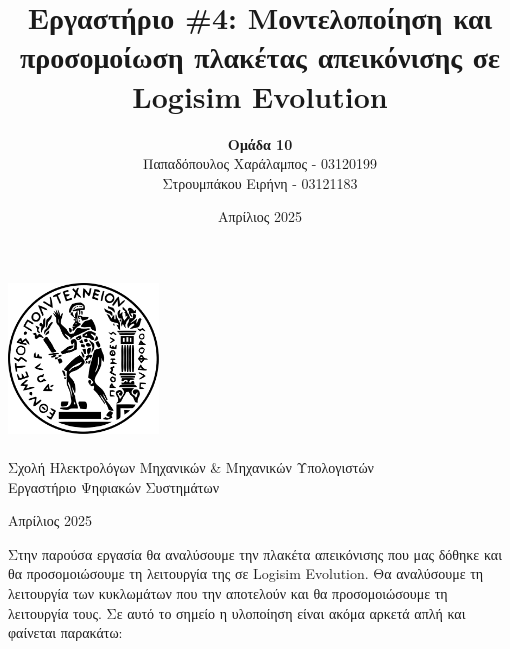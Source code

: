 \documentclass[12pt]{article}
\title{\Large Εργαστήριο \#4: Μοντελοποίηση και προσομοίωση πλακέτας απεικόνισης σε Logisim Evolution}
\author{\textbf{Ομάδα 10} \\
        Παπαδόπουλος Χαράλαμπος - 03120199\\
        Στρουμπάκου Ειρήνη  - 03121183 \\
}
\date{Απρίλιος 2025}
\begin{document}
    \begin{titlepage}
        \centering
        \vspace{3cm}

        \includegraphics[width=4cm]{figures/emp.png}\\
        \vspace{1.5cm}
        {\fontsize{24pt}{20pt}\selectfont{Εθνικό Μετσόβιο Πολυτεχνείο}}\\[0.3cm]
        {\fontsize{16pt}{18pt}\selectfont Σχολή Ηλεκτρολόγων Μηχανικών \& Μηχανικών Υπολογιστών}\\[0.3cm]
        {\fontsize{16pt}{18pt}\selectfont Εργαστήριο Ψηφιακών Συστημάτων}\\[2cm]

        {\bfseries \thetitle \par}
        \vspace{2cm}
        {\theauthor \par}
        \vfill
        \vspace{4cm}

        {\fontsize{15pt}{18pt}Απρίλιος 2025}
    \end{titlepage}

Στην παρούσα εργασία θα αναλύσουμε την πλακέτα απεικόνισης που μας δόθηκε και θα προσομοιώσουμε τη λειτουργία της σε Logisim Evolution. 
Θα αναλύσουμε τη λειτουργία των κυκλωμάτων που την αποτελούν και θα προσομοιώσουμε τη λειτουργία τους.
\newline
Σε αυτό το σημείο η υλοποίηση είναι ακόμα αρκετά απλή και φαίνεται παρακάτω:
\end{document}

